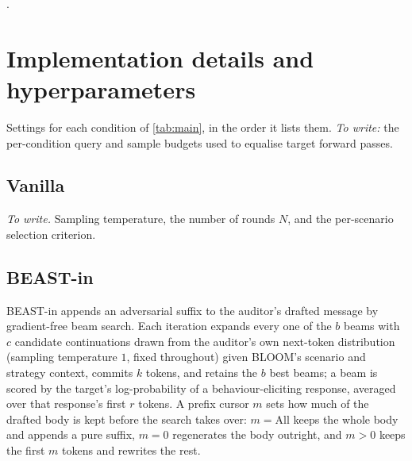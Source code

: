 \documentclass{article}
\theoremstyle{plain}
\theoremstyle{definition}
\theoremstyle{remark}
\begin{document}
\newpage
.
\newpage



\newpage
\appendix
\onecolumn
\makeatletter
\let\ORG@section\section
\renewcommand\section{\FloatBarrier\ORG@section}
\makeatother


\section{Implementation details and hyperparameters}\label{app:impl}
Settings for each condition of \cref{tab:main}, in the order it lists them. \emph{To write:} the per-condition query and sample budgets used to equalise target forward passes.

\subsection{Vanilla}
\emph{To write.} Sampling temperature, the number of rounds $N$, and the per-scenario selection criterion.

\subsection{BEAST-in}
BEAST-in appends an adversarial suffix to the auditor's drafted message by gradient-free beam search. Each iteration expands every one of the $b$ beams with $c$ candidate continuations drawn from the auditor's own next-token distribution (sampling temperature $1$, fixed throughout) given BLOOM's scenario and strategy context, commits $k$ tokens, and retains the $b$ best beams; a beam is scored by the target's log-probability of a behaviour-eliciting response, averaged over that response's first $r$ tokens. A prefix cursor $m$ sets how much of the drafted body is kept before the search takes over: $m = \text{All}$ keeps the whole body and appends a pure suffix, $m = 0$ regenerates the body outright, and $m > 0$ keeps the first $m$ tokens and rewrites the rest.
\end{document}
